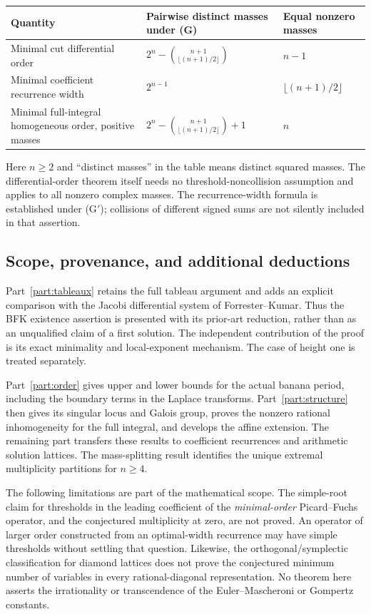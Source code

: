 \documentclass[11pt,a4paper]{article}
\theoremstyle{definition}
\theoremstyle{remark}
\numberwithin{equation}{section}
\begin{document}
\begin{center}
\begin{tabular}{@{}p{}p{}p{}@{}}
\toprule
Quantity & Pairwise distinct masses under (G) & Equal nonzero masses\\
\midrule
Minimal cut differential order &
$2^n-\binom{n+1}{\lfloor(n+1)/2\rfloor}$ & $n-1$\\[4pt]
Minimal coefficient recurrence width & $2^{n-1}$ &
$\lfloor(n+1)/2\rfloor$\\[4pt]
Minimal full-integral homogeneous order, positive masses &
$2^n-\binom{n+1}{\lfloor(n+1)/2\rfloor}+1$ & $n$\\
\bottomrule
\end{tabular}
\end{center}
Here $n\ge2$ and ``distinct masses'' in the table means distinct squared
masses. The differential-order theorem itself needs no threshold-noncollision
assumption and applies to all nonzero complex masses. The recurrence-width
formula is established under (G$'$); collisions of different signed sums are
not silently included in that assertion.

\subsection{Scope, provenance, and additional deductions}
Part~\ref{part:tableaux} retains the full tableau argument and adds an explicit
comparison with the Jacobi differential system of Forrester--Kumar. Thus the
BFK existence assertion is presented with its prior-art reduction, rather than
as an unqualified claim of a first solution. The independent contribution of
the proof is its exact minimality and local-exponent mechanism. The case of
height one is treated separately.

Part~\ref{part:order} gives upper and lower bounds for the actual banana period,
including the boundary terms in the Laplace transforms. Part~\ref{part:structure}
then gives its singular locus and Galois group, proves the nonzero rational
inhomogeneity for the full integral, and develops the affine extension.
The remaining part transfers these results to coefficient recurrences and
arithmetic solution lattices. The mass-splitting result identifies the unique
extremal multiplicity partitions for $n\ge4$.

The following limitations are part of the mathematical scope. The simple-root
claim for thresholds in the leading coefficient of the \emph{minimal-order}
Picard--Fuchs operator, and the conjectured multiplicity at zero, are not proved.
An operator of larger order constructed from an optimal-width recurrence may
have simple thresholds without settling that question. Likewise, the
orthogonal/symplectic classification for diamond lattices does not prove the
conjectured minimum number of variables in every rational-diagonal
representation. No theorem here asserts the irrationality or transcendence
of the Euler--Mascheroni or Gompertz constants.
\end{document}
